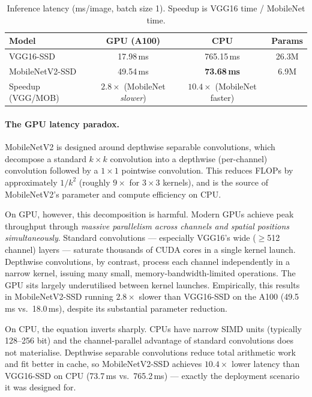 \documentclass{article}
\begin{document}
\begin{table}[h]
  \caption{Inference latency (ms/image, batch size 1). Speedup is VGG16 time / MobileNet time.}
  \label{tab:speed}
  \centering
  \begin{tabular}{lccc}
    \toprule
    Model & GPU (A100) & CPU & Params \\
    \midrule
    VGG16-SSD       & 17.98\,ms          & 765.15\,ms           & 26.3M \\
    MobileNetV2-SSD & 49.54\,ms          & \textbf{73.68\,ms}   & 6.9M  \\
    \midrule
    Speedup (VGG/MOB) & $2.8\times$ (MobileNet \emph{slower}) & $10.4\times$ (MobileNet faster) & \\
    \bottomrule
  \end{tabular}
\end{table}

\paragraph{The GPU latency paradox.}
MobileNetV2 is designed around depthwise separable convolutions, which decompose a standard $k{\times}k$ convolution into a depthwise (per-channel) convolution followed by a $1{\times}1$ pointwise convolution. This reduces FLOPs by approximately $1/k^2$ (roughly $9\times$ for $3{\times}3$ kernels), and is the source of MobileNetV2's parameter and compute efficiency on CPU.

On GPU, however, this decomposition is harmful. Modern GPUs achieve peak throughput through \emph{massive parallelism across channels and spatial positions simultaneously}. Standard convolutions — especially VGG16's wide ($\geq$512 channel) layers — saturate thousands of CUDA cores in a single kernel launch. Depthwise convolutions, by contrast, process each channel independently in a narrow kernel, issuing many small, memory-bandwidth-limited operations. The GPU sits largely underutilised between kernel launches. Empirically, this results in MobileNetV2-SSD running $2.8\times$ slower than VGG16-SSD on the A100 (49.5\,ms vs.\ 18.0\,ms), despite its substantial parameter reduction.

On CPU, the equation inverts sharply. CPUs have narrow SIMD units (typically 128–256 bit) and the channel-parallel advantage of standard convolutions does not materialise. Depthwise separable convolutions reduce total arithmetic work and fit better in cache, so MobileNetV2-SSD achieves $10.4\times$ lower latency than VGG16-SSD on CPU (73.7\,ms vs.\ 765.2\,ms) — exactly the deployment scenario it was designed for.
\end{document}
